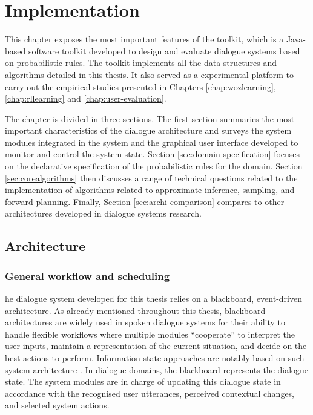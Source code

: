 \chapter{Implementation}
\label{chap:opendial}


This chapter exposes the most important features of the \opendial toolkit, which is a Java-based software toolkit developed to design and evaluate dialogue systems based on probabilistic rules. The toolkit implements all the data structures and algorithms detailed in this thesis.  It also served as a experimental platform to carry out the empirical studies presented in Chapters \ref{chap:wozlearning}, \ref{chap:rllearning} and \ref{chap:user-evaluation}. 

The chapter is divided in three sections.  The first section summaries the most important characteristics of the dialogue architecture and surveys the system modules integrated in the system and the graphical user interface developed to monitor and control the system state.  Section \ref{sec:domain-specification} focuses on the declarative specification of the probabilistic rules for the domain. Section \ref{sec:corealgorithms} then discusses a range of technical questions related to the implementation of algorithms related to approximate inference, sampling, and forward planning. Finally, Section \ref{sec:archi-comparison} compares \opendial to other architectures developed in dialogue systems research. 

\section{Architecture}
\label{sec:genarchitecture}

\subsection{General workflow and scheduling}

he dialogue system developed for this thesis relies on a blackboard, event-driven architecture. As already mentioned throughout this thesis, blackboard architectures are widely used in spoken dialogue systems for their ability to handle flexible workflows where multiple modules ``cooperate'' to  interpret the user inputs, maintain a representation of the current situation, and decide on the best actions to perform. Information-state approaches are notably based on such system architecture \cite{Larsson:2000:ISD:973935.973943}. In dialogue domains, the blackboard represents the dialogue state. The system modules are in charge of updating this dialogue state in accordance with the recognised user utterances, perceived contextual changes, and selected system actions. 

